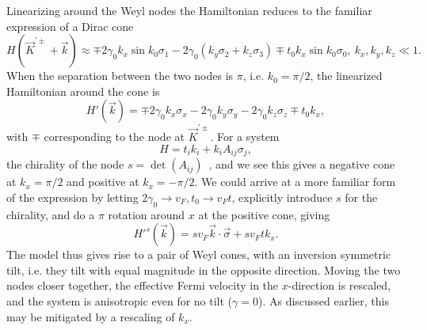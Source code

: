 Linearizing around the Weyl nodes the Hamiltonian reduces to the familiar expression of a Dirac cone
\begin{equation}
  \label{eq:7}
  H(\vec{K} ^{'\pm} + \vec{k}) \approx \mp 2 \gamma_0 k_{x} \sin k_{0} \sigma_{1} - 2 \gamma_0 (k_{y} \sigma_{2} + k_{z} \sigma_{3}) \mp t_0 k_{x} \sin k_{0} \sigma_{0}, \: k_{x}, k_{y}, k_{z} \ll 1.
\end{equation}
When the separation between the two nodes is \(\pi\), i.e. \(k_{0} = \pi/ 2 \), the linearized Hamiltonian around the cone is
\begin{equation}
  \label{eq:8}
  H'(\vec{k}) = \mp 2 \gamma_0 k_{x} \sigma_{x} - 2 \gamma_0 k_{y} \sigma_{y} - 2 \gamma_0 k_{z} \sigma_{z} \mp t_0 k_{x},
\end{equation}
with \( \mp \) corresponding to the node at \( \vec{K}^{' \pm} \).
For a system
\begin{equation}
  \label{eq:155}
  H = t_i k_i + k_i A_{ij} \sigma_j,
\end{equation}
the chirality of the node \( s = \det(A_{ij}) \)~\cite{mccormickMinimalModelsTopological2017}, and we see this gives a negative cone at \( k_x = \pi /2 \) and positive at \( k_x = -\pi /2 \).
We could arrive at a more familiar form of the expression by letting \( 2 \gamma_0 \to v_F, t_0 \to v_F t \), explicitly introduce \( s \) for the chirality, and do a \( \pi \) rotation around \( x \) at the positive cone, giving
\begin{equation}
  \label{eq:158}
  H'^{s}(\vec{k}) = s v_F \vec{k} \cdot \vec{\sigma} + s v_F t k_x.
\end{equation}
The model thus gives rise to a pair of Weyl cones, with an inversion symmetric tilt, i.e. they tilt with equal magnitude in the opposite direction.
Moving the two nodes closer together, the effective Fermi velocity in the \(x\)-direction is rescaled, and the system is anisotropic even for no tilt (\(\gamma=0\)).
As discussed earlier, this may be mitigated by a rescaling of \( k_x \).


